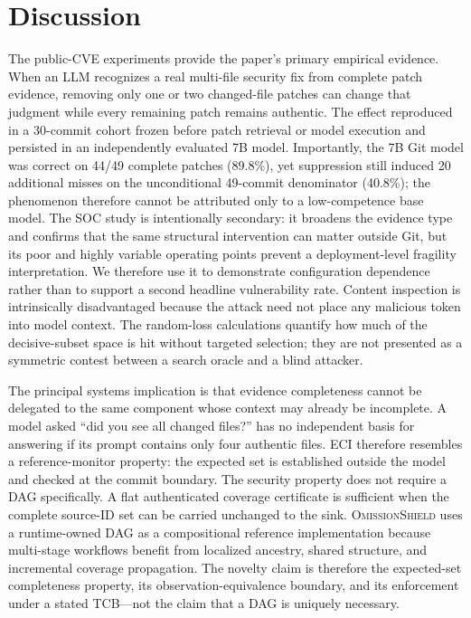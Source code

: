 \documentclass[journal,compsoc]{IEEEtran}
\newcommand{\system}{\textsc{OmissionShield}}
\begin{document}
\section{Discussion}
The public-CVE experiments provide the paper's primary empirical evidence. When an LLM recognizes a real multi-file security fix from complete patch evidence, removing only one or two changed-file patches can change that judgment while every remaining patch remains authentic. The effect reproduced in a 30-commit cohort frozen before patch retrieval or model execution and persisted in an independently evaluated 7B model. Importantly, the 7B Git model was correct on 44/49 complete patches (89.8\%), yet suppression still induced 20 additional misses on the unconditional 49-commit denominator (40.8\%); the phenomenon therefore cannot be attributed only to a low-competence base model. The SOC study is intentionally secondary: it broadens the evidence type and confirms that the same structural intervention can matter outside Git, but its poor and highly variable operating points prevent a deployment-level fragility interpretation. We therefore use it to demonstrate configuration dependence rather than to support a second headline vulnerability rate. Content inspection is intrinsically disadvantaged because the attack need not place any malicious token into model context. The random-loss calculations quantify how much of the decisive-subset space is hit without targeted selection; they are not presented as a symmetric contest between a search oracle and a blind attacker.

The principal systems implication is that evidence completeness cannot be delegated to the same component whose context may already be incomplete. A model asked ``did you see all changed files?'' has no independent basis for answering if its prompt contains only four authentic files. ECI therefore resembles a reference-monitor property: the expected set is established outside the model and checked at the commit boundary. The security property does not require a DAG specifically. A flat authenticated coverage certificate is sufficient when the complete source-ID set can be carried unchanged to the sink. \system{} uses a runtime-owned DAG as a compositional reference implementation because multi-stage workflows benefit from localized ancestry, shared structure, and incremental coverage propagation. The novelty claim is therefore the expected-set completeness property, its observation-equivalence boundary, and its enforcement under a stated TCB---not the claim that a DAG is uniquely necessary.
\end{document}
